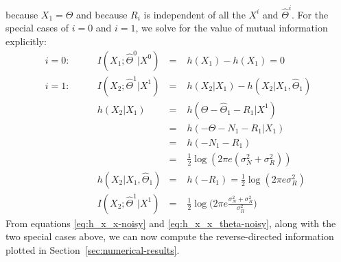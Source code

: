 \documentclass[letterpaper, 10pt, conference]{ieeeconf}
\begin{document}
because $X_1 = \Theta$ and because $R_i$ is independent of all the $X^i$ and $\widehat\Theta^i$. For the special cases of $i=0$ and $i=1$, we solve for the value of mutual information explicitly:
\begin{align*}
	i = 0: & \qquad I(X_1; \widehat\Theta^0 | X^0) &=& \; h(X_1) - h(X_1) = 0 \\
	i = 1: & \qquad I(X_2; \widehat\Theta^1 | X^1) &=& \; h(X_2 | X_1) - h(X_2 | X_1, \widehat\Theta_1) \\
		   & \qquad h(X_2 | X_1)                   &=& \; h(\Theta - \widehat\Theta_1 - R_1 | X^1) \\
		   & \qquad                                &=& \; h(-\Theta - N_1 - R_1 | X_1) \\
		   & \qquad                                &=& \; h(-N_1 - R_1) \\
		   & \qquad                                &=& \; \frac{1}{2} \log(2 \pi e (\sigma_N^2 + \sigma_R^2)) \\
		   & \qquad h(X_2 | X_1, \widehat\Theta_1) &=& \; h(-R_1) = \frac{1}{2} \log(2 \pi e \sigma_R^2) \\
		   & \qquad I(X_2; \widehat\Theta^1 | X^1) &=& \; \frac{1}{2} \log \bigg( 2 \pi e \frac{\sigma_N^2 + \sigma_R^2}{\sigma_R^2} \bigg)
\end{align*}
From equations \eqref{eq:h_x_x-noisy} and \eqref{eq:h_x_x_theta-noisy}, along with the two special cases above, we can now compute the reverse-directed information plotted in Section~\ref{sec:numerical-results}.






%
%
%




\end{document}
